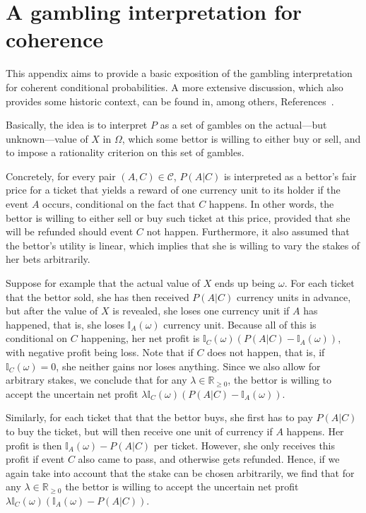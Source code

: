 \documentclass[10pt,a4paper]{paper}
\theoremstyle{definition}
\newcommand{\reals}{\mathbb{R}}
\newcommand{\realsnonneg}{\reals_{\geq 0}}
\newcommand{\ind}[1]{\mathbb{I}_{#1}}
\begin{document}
\section{A gambling interpretation for coherence}\label{app:coherence}

This appendix aims to provide a basic exposition of the gambling interpretation for coherent conditional probabilities. A more extensive discussion, which also provides some historic context, can be found in, among others, References~\cite{regazzini1985finitely,williams1975,Williams:2007eu, Vicig:2007gs,berti1991coherent, berti2002coherent}.

Basically, the idea is to interpret $P$ as a set of gambles on the actual---but unknown---value of $X$ in $\Omega$, which some bettor is willing to either buy or sell, and to impose a rationality criterion on this set of gambles.

Concretely, for every pair $(A,C)\in\mathcal{C}$, $P(A\vert C)$ is interpreted as a bettor's fair price for a ticket that yields a reward of one currency unit to its holder if the event $A$ occurs, conditional on the fact that $C$ happens. In other words, the bettor is willing to either sell or buy such ticket at this price, provided that she will be refunded should event $C$ not happen. Furthermore, it also assumed that the bettor's utility is linear, which implies that she is willing to vary the stakes of her bets arbitrarily.


Suppose for example that the actual value of $X$ ends up being $\omega$. For each ticket that the bettor sold, she has then received $P(A\vert C)$ currency units in advance, but after the value of $X$ is revealed, she loses one currency unit if $A$ has happened, that is, she loses $\ind{A}(\omega)$ currency unit. Because all of this is conditional on $C$ happening, her net profit is $\ind{C}(\omega)(P(A\vert C) - \ind{A}(\omega))$, with negative profit being loss. Note that if $C$ does not happen, that is, if $\ind{C}(\omega)=0$, she neither gains nor loses anything. Since we also allow for arbitrary stakes, we conclude that for any $\lambda\in\realsnonneg$, the bettor is willing to accept the uncertain net profit $\lambda \ind{C}(\omega)(P(A\vert C) - \ind{A}(\omega))$.

Similarly, for each ticket that that the bettor buys, she first has to pay $P(A\vert C)$ to buy the ticket, but will then receive one unit of currency if $A$ happens. Her profit is then $\ind{A}(\omega) - P(A\vert C)$ per ticket. However, she only receives this profit if event $C$ also came to pass, and otherwise gets refunded. Hence, if we again take into account that the stake can be chosen arbitrarily, we find that for any $\lambda\in\realsnonneg$ the bettor is willing to accept the uncertain net profit $\lambda\ind{C}(\omega)(\ind{A}(\omega) - P(A\vert C))$. 
\end{document}
